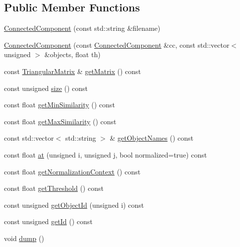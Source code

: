 \subsection*{Public Member Functions}
\begin{DoxyCompactItemize}
\item 
\hyperlink{classConnectedComponent_ab50e52197cb4972bc577580100641a63}{Connected\-Component} (const std\-::string \&filename)
\item 
\hyperlink{classConnectedComponent_ac5a046154167589817d6f6b0c0a91589}{Connected\-Component} (const \hyperlink{classConnectedComponent}{Connected\-Component} \&cc, const std\-::vector$<$ unsigned $>$ \&objects, float th)
\item 
const \hyperlink{classTriangularMatrix}{Triangular\-Matrix} \& \hyperlink{classConnectedComponent_ab44848438efe7560f1b0e923779638a3}{get\-Matrix} () const 
\item 
const unsigned \hyperlink{classConnectedComponent_a0ab1852c0c4cc9f224a59d3e8670d009}{size} () const 
\item 
const float \hyperlink{classConnectedComponent_aff31974c26d909f216620e186a978246}{get\-Min\-Similarity} () const 
\item 
const float \hyperlink{classConnectedComponent_a674bc2a6eee509ac9ea0efc45a1e4378}{get\-Max\-Similarity} () const 
\item 
const std\-::vector$<$ std\-::string $>$ \& \hyperlink{classConnectedComponent_af0f73d769badaf6331d037f7a8f3c7e6}{get\-Object\-Names} () const 
\item 
const float \hyperlink{classConnectedComponent_a079a714fe4b6ceef8c47f5fc50eaf4ea}{at} (unsigned i, unsigned j, bool normalized=true) const 
\item 
const float \hyperlink{classConnectedComponent_a9595ddaa93ca5a70fc4969357ea54b01}{get\-Normalization\-Context} () const 
\item 
const float \hyperlink{classConnectedComponent_ac2828775d06586f68945912765964698}{get\-Threshold} () const 
\item 
const unsigned \hyperlink{classConnectedComponent_a69e112172cd01a4983251e98fdc8839e}{get\-Object\-Id} (unsigned i) const 
\item 
const unsigned \hyperlink{classConnectedComponent_ab09f5a1c65d0e941934177a17f9e8df7}{get\-Id} () const 
\item 
void \hyperlink{classConnectedComponent_ac94e68d23ee387217f23c05a5ba1047c}{dump} ()
\end{DoxyCompactItemize}


